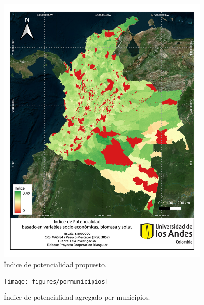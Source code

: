\begin{figure}
    \centering
    \includegraphics[width=0.95\textwidth]{figures/indice}
    \caption{Índice de potencialidad propuesto.}
    \label{fig:indice}
\end{figure}

\begin{figure}
    \centering
    \texttt{[image: figures/pormunicipios]}
    \caption{Índice de potencialidad agregado por municipios.}
    \label{fig:pormunicipios}
\end{figure}

